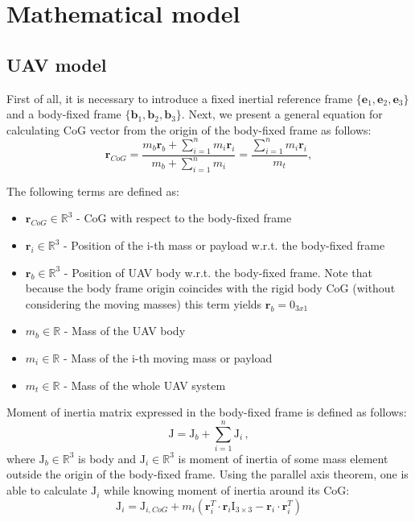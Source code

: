 \section{Mathematical model}

\subsection{UAV model}
First of all, it is necessary to introduce a fixed inertial reference frame $\{  \textbf{e}_1,  \textbf{e}_2,  \textbf{e}_3  \}$ and a body-fixed frame $ \{  \textbf{b}_1,  \textbf{b}_2,  \textbf{b}_3 \}$. Next, we present
a general equation for calculating CoG vector from the origin of the body-fixed frame as follows: 
\begin{equation}
	\textbf{r}_{CoG} = \frac{m_{b}\textbf{r}_{b} + \sum_{i=1}^n m_{i} \textbf{r}_{i}}{m_{b} + \sum_{i=1}^n m_{i}} = \frac{\sum_{i=1}^n m_{i}\textbf{r}_{i}}{m_t},
	\label{equ:cog}
\end{equation}

The following terms are defined as: 
\begin{itemize}
	\item $ \textbf{r}_{CoG} \in \mathbb{\text{R}}^3$ - CoG with respect to the body-fixed frame
	
	\item $ \textbf{r}_{i} \in \mathbb{\text{R}}^3$ - Position of the i-th mass or payload w.r.t. the body-fixed frame
	
	\item $ \textbf{r}_{b} \in \mathbb{\text{R}}^3$ - Position of UAV body w.r.t. the body-fixed frame. Note that because the body frame origin coincides with the rigid body CoG (without considering the moving masses) this term yields $ \textbf{r}_b = 0_{3x1}$
	
	\item $m_b \in \mathbb{R}$ - Mass of the UAV body 
	
	\item $m_i \in \mathbb{R}$ - Mass of the i-th moving mass or payload
	
	\item $m_t \in \mathbb{R}$ - Mass of the whole UAV system
\end{itemize}

Moment of inertia matrix expressed in the body-fixed frame is defined as follows:
\begin{equation}
\text{J} = \text{J}_b + \sum_{i=1}^{n}\text{J}_i \, ,
\end{equation}
where $\text{J}_b \in \mathbb{R}^3$ is body and $\text{J}_i \in \mathbb{R}^3$ is moment of inertia of some mass element outside the origin of the body-fixed frame. Using the parallel axis theorem, one is able to calculate $\text{J}_i$ while knowing moment of inertia around its CoG:
\begin{equation}
\text{J}_i = \text{J}_{i,CoG} + m_i( \textbf{r}_i^T \cdot  \textbf{r}_i \text{I}_{3 \times 3} -  \textbf{r}_i \cdot  \textbf{r}_i^T)
\end{equation}

